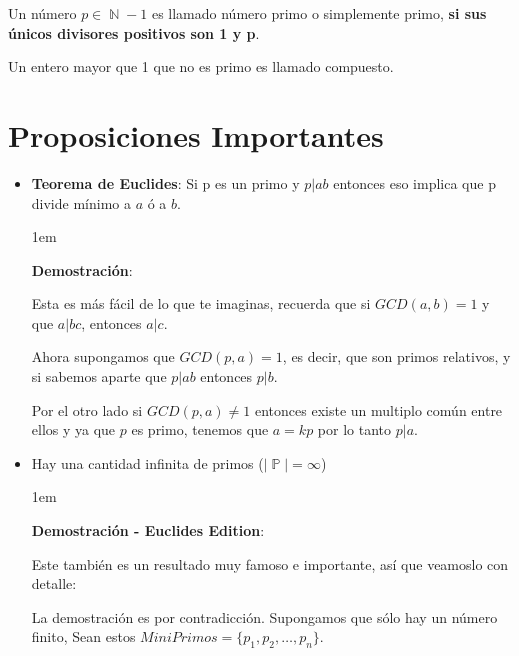 \documentclass[12pt, fleqn]{report}                             %
\newenvironment{SmallIndentation}[1][0.75em]                    %
    {\begin{adjustwidth}{#1}{}\begin{footnotesize}}                 %
    {\end{footnotesize}\end{adjustwidth}}                           %
\DeclareMathOperator \Naturals  {\mathbb{N}}                     %
\DeclareMathOperator \Primes    {\mathbb{P}}                     %
\begin{document}
            Un número $p \in \Naturals - {1}$ es llamado número primo o simplemente
            primo, \textbf{si sus únicos divisores positivos son 1 y p}.

            Un entero mayor que 1 que no es primo es llamado compuesto.

         
    \section{Proposiciones Importantes}

        \begin{itemize}

            \item \textbf{Teorema de Euclides}:
                Si p es un primo y $p|ab$ entonces eso implica que p divide mínimo
                a $a$ ó a $b$.

                \begin{SmallIndentation}[1em]
                    \textbf{Demostración}:

                    Esta es más fácil de lo que te imaginas, recuerda que si
                    $GCD(a,b) = 1$ y que $a|bc$, entonces $a|c$.

                    Ahora supongamos que $GCD(p,a) = 1$, es decir, que son primos
                    relativos, y si sabemos aparte que $p|ab$ entonces $p|b$.

                    Por el otro lado si $GCD(p, a) \neq 1$ entonces existe un multiplo
                    común entre ellos y ya que $p$ es primo, tenemos que $a=kp$ por lo
                    tanto $p|a$.

                \end{SmallIndentation}


            \item Hay una cantidad infinita de primos ($|\Primes| = \infty$)

                \begin{SmallIndentation}[1em]
                    \textbf{Demostración - Euclides Edition}:

                    Este también es un resultado muy famoso e importante, así
                    que veamoslo con detalle:

                    La demostración es por contradicción.
                    Supongamos que sólo hay un número finito, Sean estos 
                    $MiniPrimos = \{ p_1, p_2, \dots, p_n\}$.


\end{SmallIndentation}
\end{itemize}
\end{document}
